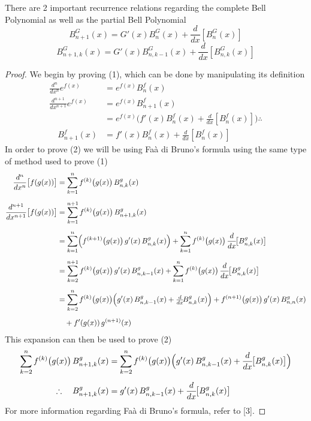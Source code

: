 \documentclass[11pt]{article}
\theoremstyle{plain}
\theoremstyle{definition}
\begin{document}
There are 2 important recurrence relations regarding the complete Bell Polynomial as well as the partial Bell Polynomial
\begin{equation}
    B_{n+1}^G(x) = G'(x)B_n^G(x) + \frac{d}{dx}\left[ B_n^G(x)\right]
\end{equation}
\begin{equation}
    B_{n+1,k}^G(x) = G'(x)B_{n,k-1}^G(x) + \frac{d}{dx}\left[ B_{n,k}^G(x)\right]
\end{equation}
\begin{proof}
    We begin by proving (1), which can be done by manipulating its definition
\begin{align*}
\frac{d^n}{dx^n} e^{f(x)} &= e^{f(x)} B^f_n(x) \\
\frac{d^{n+1}}{dx^{n+1}} e^{f(x)} &= e^{f(x)} B^f_{n+1}(x) \\
&= e^{f(x)}\bigl( f'(x) B^f_n(x) + \frac{d}{dx}[B^f_n(x)] \bigr) \therefore\\
\quad B^f_{n+1}(x) &= f'(x) B^f_n(x) + \frac{d}{dx}[B^f_n(x)]
\end{align*}
In order to prove (2) we will be using Faà di Bruno’s formula using the same type of method used to prove (1)
\begin{align*}
\frac{d^n}{dx^n}\bigl[f(g(x))\bigr]
&= \sum_{k=1}^{n} f^{(k)}\bigl(g(x)\bigr)\,B^{g}_{n,k}(x) \\[0.5em]
\frac{d^{n+1}}{dx^{n+1}}\bigl[f(g(x))\bigr]
&= \sum_{k=1}^{n+1} f^{(k)}\bigl(g(x)\bigr)\,B^{g}_{n+1,k}(x) \\[0.5em]
&= \sum_{k=1}^{n} \Bigl(f^{(k+1)}\bigl(g(x)\bigr)\,g'(x)\,B^{g}_{n,k}(x)\Bigr)
   + \sum_{k=1}^{n} f^{(k)}\bigl(g(x)\bigr)\,\frac{d}{dx}\!\bigl[B^{g}_{n,k}(x)\bigr] \\[0.5em]
&= \sum_{k=2}^{n+1} f^{(k)}\bigl(g(x)\bigr)\,g'(x)\,B^{g}_{n,k-1}(x)
   + \sum_{k=1}^{n} f^{(k)}\bigl(g(x)\bigr)\,\frac{d}{dx}\!\bigl[B^{g}_{n,k}(x)\bigr] \\[0.5em]
&= \sum_{k=2}^{n} f^{(k)}\bigl(g(x)\bigr)\Bigl(g'(x)\,B^{g}_{n,k-1}(x)
   + \tfrac{d}{dx}\!B^{g}_{n,k}(x)\Bigr)
   + f^{(n+1)}\bigl(g(x)\bigr)\,g'(x)\,B^{g}_{n,n}(x) \\[0.5em]
&\quad + f'(g(x))\,g^{(n+1)}(x)
\end{align*}
This expansion can then be used to prove (2)
\begin{align*}
\sum_{k=2}^{n} f^{(k)}\bigl(g(x)\bigr)\,B^{g}_{n+1,k}(x)
&= \sum_{k=2}^{n} f^{(k)}\bigl(g(x)\bigr)\Bigl(g'(x)\,B^{g}_{n,k-1}(x)
    + \frac{d}{dx}\!\bigl[B^{g}_{n,k}(x)\bigr]\Bigr) \\[0.5em]
\therefore\quad B^{g}_{n+1,k}(x)
&= g'(x)\,B^{g}_{n,k-1}(x) + \frac{d}{dx}\!\bigl[B^{g}_{n,k}(x)\bigr]
\end{align*}
For more information regarding Faà di Bruno’s formula, refer to [3].
\end{proof}
\end{document}
